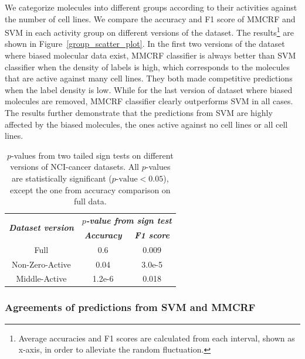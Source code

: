 \documentclass[english]{tktltiki}
\begin{document}
We categorize molecules into different groups according to their activities against the number of cell lines. We compare the accuracy and F1 score of MMCRF and SVM in each activity group on different versions of the dataset. The results\footnote{Average accuracies and F1 scores are calculated from each interval, shown as x-axis, in order to alleviate the random fluctuation.} are shown in Figure~\ref{group_scatter_plot}. In the first two versions of the dataset where biased molecular data exist, MMCRF classifier is always better than SVM classifier when the density of labels is high, which corresponds to the molecules that are active against many cell lines. They both made competitive predictions when the label density is low. While for the last version of dataset where biased molecules are removed, MMCRF classifier clearly outperforms SVM in all cases. The results further demonstrate that the predictions from SVM are highly affected by the biased molecules, the ones active against no cell lines or all cell lines.

\begin{center}
\begin{table}
\centering
\begin{tabular}{|c||c|c|}\hline
\multirow{2}{*}{\textbf{\em Dataset version}}
 & \multicolumn{2}{|c|}{\bf\em $p$-value from sign test} \\ \cline{2-3}
 & \textbf{\em Accuracy }  &\textbf{\em F1 score } \\ \hline \hline
Full & {0.6} & {0.009} \\ \hline
Non-Zero-Active & {0.04} & {3.0e-5} \\ \hline
Middle-Active& {1.2e-6} & {0.018} \\ \hline
\end{tabular}
\caption[Sign test.]{$p$-values from two tailed sign tests on different versions of NCI-cancer datasets. All $p$-values are statistically significant ($p\text{-value}<0.05$), except the one from accuracy comparison on full data.}
\label{sign_test}
\end{table}
\end{center}

\subsubsection{Agreements of predictions from SVM and MMCRF}
\end{document}
